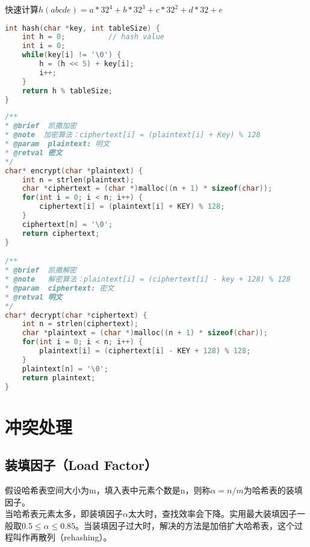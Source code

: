 快速计算$ h(abcde) = a * 32^4 + b * 32^3 + c * 32^2 + d * 32 + e $

\begin{lstlisting}[language=C]
int hash(char *key, int tableSize) {
    int h = 0;          // hash value
    int i = 0;
    while(key[i] != '\0') {
        h = (h << 5) + key[i];
        i++;
    }
    return h % tableSize;
}
\end{lstlisting}

\vspace{0.5cm}


\begin{lstlisting}[language=C]
/**
* @brief  凯撒加密
* @note  加密算法：ciphertext[i] = (plaintext[i] + Key) % 128
* @param  plaintext: 明文
* @retval 密文
*/
char* encrypt(char *plaintext) {
    int n = strlen(plaintext);
    char *ciphertext = (char *)malloc((n + 1) * sizeof(char));
    for(int i = 0; i < n; i++) {
        ciphertext[i] = (plaintext[i] + KEY) % 128;
    }
    ciphertext[n] = '\0';
    return ciphertext;
}

/**
* @brief  凯撒解密
* @note   解密算法：plaintext[i] = (ciphertext[i] - key + 128) % 128
* @param  ciphertext: 密文
* @retval 明文
*/
char* decrypt(char *ciphertext) {
    int n = strlen(ciphertext);
    char *plaintext = (char *)malloc((n + 1) * sizeof(char));
    for(int i = 0; i < n; i++) {
        plaintext[i] = (ciphertext[i] - KEY + 128) % 128;
    }
    plaintext[n] = '\0';
    return plaintext;
}
\end{lstlisting}

\newpage

\section{冲突处理}

\subsection{装填因子（Load Factor）}

假设哈希表空间大小为m，填入表中元素个数是n，则称$ \alpha = n / m $为哈希表的装填因子。 \\

当哈希表元素太多，即装填因子$ \alpha $太大时，查找效率会下降。实用最大装填因子一般取$ 0.5 \le \alpha \le 0.85 $。当装填因子过大时，解决的方法是加倍扩大哈希表，这个过程叫作再散列（rehashing）。 \\

